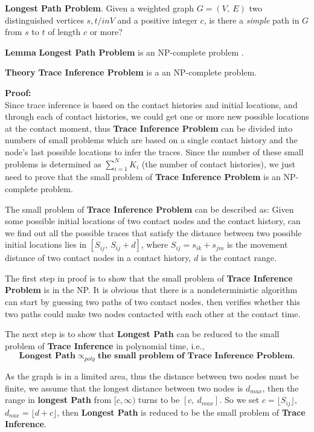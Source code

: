 \textbf{Longest Path Problem}. Given a weighted graph $G=(V,~E)$
two distinguished vertices $s,t /in V$ and a positive integer $c$,
is there a \emph{simple} path in $G$ from $s$ to $t$ of length $c$ or more?

\textbf{Lemma} \textbf{Longest Path Problem} is an NP-complete problem \cite{NP-complete}.

\textbf{Theory} \textbf{Trace Inference Problem} is a an NP-complete problem.

{\bf Proof:}\\
Since trace inference is based on the contact histories and initial locations, and through each of contact histories, we could get one or more new possible locations at the contact moment, thus \textbf{Trace Inference Problem} can be divided into numbers of small problems which are based on a single contact history and the node's last possible locations to infer the traces. Since the number of these small problems is determined as $\sum_{i=1}^N {K_i}$ (the number of contact histories), we just need to prove that the small problem of \textbf{Trace Inference Problem} is an NP-complete problem.

The small problem of \textbf{Trace Inference Problem} can be described as: Given some possible initial locations of two contact nodes and the contact history, can we find out all the possible traces that satisfy the distance between two possible initial locations lies in $[S_{ij},~S_{ij}+d]$, where $S_{ij}=s_{ik}+s_{jm}$ is the movement distance of two contact nodes in a contact history, $d$ is the contact range.

The first step in proof is to show that the small problem of \textbf{Trace Inference Problem} is in the NP.
It is obvious that there is a nondeterministic algorithm can start by guessing two paths of two contact nodes, then verifies whether this two paths could make two nodes contacted with each other at the contact time.

The next step is to show that \textbf{Longest Path} can be reduced to the small problem of \textbf{Trace Inference} in polynomial time, i.e.,
\begin{displaymath}
\textbf{Longest Path} \propto_{poly} \textbf{the small problem of Trace Inference Problem}.
\end{displaymath}

As the graph is in a limited area, thus the distance between two nodes must be finite, we assume that the longest distance between two nodes is $d_{max}$, then the range in \textbf{longest Path} from $[c,\infty)$ turns to be $[c,~d_{max}]$. So we set $c=\lfloor S_{ij} \rfloor$, $d_{nax}=\lfloor d+c \rfloor$, then \textbf{Longest Path} is reduced to be the small problem of \textbf{Trace Inference}.






